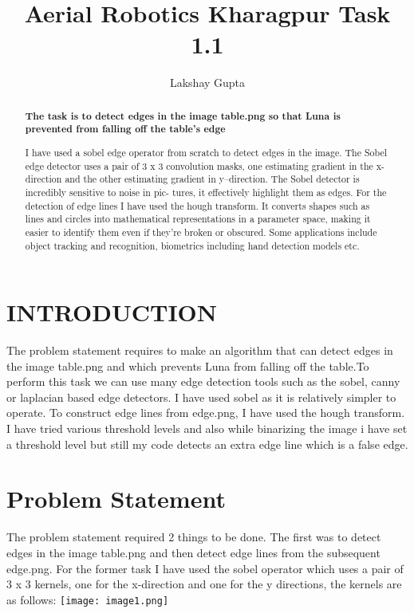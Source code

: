 \documentclass[letterpaper, 10 pt, conference]{ieeeconf}
\title{\LARGE \bf
Aerial Robotics Kharagpur Task 1.1
}
\author{Lakshay Gupta  
}
\begin{document}
\maketitle 
\thispagestyle{empty}
\pagestyle{empty}


\begin{abstract}
\textbf{The task is to detect edges in the image table.png so that Luna is prevented from falling off the table's edge}


I have used a sobel edge operator from scratch to detect edges in the image. The Sobel edge detector uses a pair of 3 x 3 convolution masks, one estimating gradient in the x-direction and the other estimating gradient in y–direction. The Sobel detector is incredibly sensitive to noise in pic- tures, it effectively highlight them as edges. For the detection of edge lines I have used the hough transform. It converts shapes such as lines and circles into mathematical representations in a parameter space, making it easier to identify them even if they're broken or obscured. Some applications include object tracking and recognition, biometrics including hand detection models etc.
\end{abstract}




\section{INTRODUCTION}

The problem statement requires to make an algorithm that can detect edges in the image table.png and which prevents Luna from falling off the table.To perform this task we can use many edge detection tools such as the sobel, canny or laplacian based edge detectors. I have used sobel as it is relatively simpler to operate. To construct edge lines from edge.png, I have used the hough transform. I have tried various threshold levels and also while binarizing the image i have set a threshold level but still my code detects an extra edge line which is a false edge.

\section{Problem Statement}

The problem statement required 2 things to be done. The first was to detect edges in the image table.png and then detect edge lines from the subsequent edge.png. For the former task I have used the sobel operator which uses a pair of 3 x 3 kernels, one for the x-direction and one for the y directions, the kernels are as follows:
    \centering
    \texttt{[image: image1.png]}
    \label{}
\end{document}
